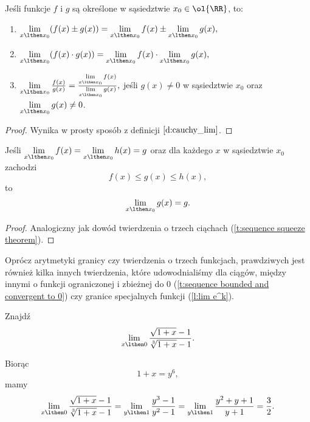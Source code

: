 \begin{theorem}
    Jeśli funkcje $f$ i $g$ są określone w sąsiedztwie $x_0 \in \ol{\RR}$, to:
    \begin{enumerate}
        \item $\lim\limits_{x\lthen x_0} (f(x) \pm g(x)) = \lim\limits_{x\lthen x_0} f(x) \pm \lim\limits_{x\lthen x_0} g(x),$
        \item $\lim\limits_{x\lthen x_0} (f(x) \cdot g(x)) = \lim\limits_{x\lthen x_0} f(x) \cdot \lim\limits_{x\lthen x_0} g(x),$
        \item $\lim\limits_{x\lthen x_0} \frac{f(x)}{g(x)} = \frac{\lim\limits_{x\lthen x_0} f(x)}{\lim\limits_{x\lthen x_0} g(x)},$ jeśli $g(x) \neq 0$ w sąsiedztwie $x_0$ oraz $\lim\limits_{x\lthen x_0} g(x) \neq 0$.
    \end{enumerate}
\end{theorem}
\begin{proof}
    Wynika w prosty sposób z definicji $\ref{d:cauchy_lim}$.
\end{proof}

\begin{theorem}
    \label{t:squeeze theorem}
    Jeśli $\lim\limits_{x\lthen x_0} f(x) = \lim\limits_{x\lthen x_0} h(x) = g$ oraz dla każdego $x$ w sąsiedztwie $x_0$ zachodzi
    \[ f(x) \leq g(x) \leq h(x), \]
    to
    \[ \lim\limits_{x\lthen x_0} g(x) = g. \]
\end{theorem}
\begin{proof}
    Analogiczny jak dowód twierdzenia o trzech ciąchach (\ref{t:sequence squeeze theorem}).
\end{proof}

\begin{remark}
    Oprócz arytmetyki granicy czy twierdzenia o trzech funkcjach, prawdziwych jest również kilka innych twierdzenia, które udowodnialiśmy dla ciągów, między innymi o funkcji ograniczonej i zbieżnej do $0$ (\ref{t:sequence bounded and convergent to 0}) czy granice specjalnych funkcji (\ref{l:lim e^k}).
\end{remark}

\begin{example}  %
    Znajdź
    \[ \lim_{x \lthen 0} \frac{\sqrt{1+ x} - 1}{\sqrt[3]{1 + x} - 1}. \]
\end{example}
\begin{solution}
    Biorąc
    \[ 1 + x = y^6, \]
    mamy
    \[ \lim_{x \lthen 0} \frac{\sqrt{1+ x} - 1}{\sqrt[3]{1 + x} - 1} = \lim_{y \lthen 1} \frac{y^3 - 1}{y^2 - 1} = \lim_{y \lthen 1} \frac{y^2 + y + 1}{y + 1} = \frac{3}{2}. \]
\end{solution}

